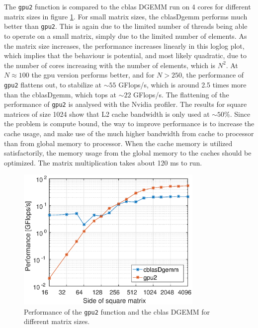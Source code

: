 The \texttt{gpu2} function is compared to the cblas DGEMM run on 4 cores for different matrix sizes in figure \ref{fig:gpu2_DGEMM}. For small matrix sizes, the cblasDgemm performs much better than \texttt{gpu2}. This is again due to the limited number of threads being able to operate on a small matrix, simply due to the limited number of elements. As the matrix size increases, the performance increases linearly in this loglog plot, which implies that the behaviour is potential, and most likely quadratic, due to the number of cores increasing with the number of elements, which is $N^2$. At $N \approx 100$ the gpu version performs better, and for $N> 250$, the performance of \texttt{gpu2} flattens out, to stabilize at $\sim 55$ GFlops/s, which is around 2.5 times more than the cblasDgemm, which tops at $\sim 22$ GFlops/s. The flattening of the performance of \texttt{gpu2} is analysed with the Nvidia profiler. The results  for square matrices of size 1024 show that L2 cache bandwidth is only used at $\sim 50 \%$. Since the problem is compute bound, the way to improve performance is to increase the cache usage, and make use of the much higher bandwidth from cache to processor than from global memory to processor. When the cache memory is utilized satisfactorily, the memory usage from the global memory to the caches should be optimized. The matrix multiplication takes about 120 ms to run.

\begin{figure}
\centering
\includegraphics[width = 0.8\textwidth]{fig/gpu2.eps}
\caption{Performance of the \texttt{gpu2} function and the cblas DGEMM for different matrix sizes.}
\label{fig:gpu2_DGEMM}
\end{figure}

